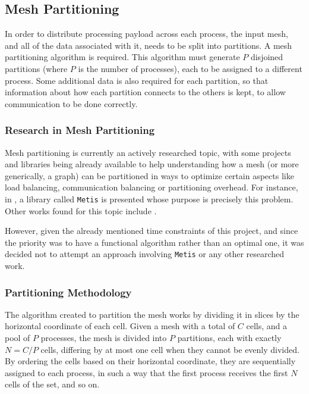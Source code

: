 \subsection{Mesh Partitioning}
\label{subsec:mpi:partitioning}


In order to distribute processing payload across each process, the input mesh, and all of the data associated with it, needs to be split into partitions.
A mesh partitioning algorithm is required. This algorithm must generate $P$ disjoined partitions (where $P$ is the number of processes), each to be assigned to a different process.
Some additional data is also required for each partition, so that information about how each partition connects to the others is kept, to allow communication to be done correctly.

\subsubsection{Research in Mesh Partitioning}
\label{subsubsec:mpi:partitioning:research}

Mesh partitioning is currently an actively researched topic, with some projects and libraries being already available to help understanding how a mesh (or more generically, a graph) can be partitioned in ways to optimize certain aspects like load balancing, communication balancing or partitioning overhead.
For instance, in \cite{metis}, a library called \texttt{Metis} is presented whose purpose is precisely this problem. Other works found for this topic include \cite{gilbert1995, walshaw2000}.

However, given the already mentioned time constraints of this project, and since the priority was to have a functional algorithm rather than an optimal one, it was decided not to attempt an approach involving \texttt{Metis} or any other researched work.

\subsubsection{Partitioning Methodology}
\label{subsubsec:mpi:partitioning:method}

The algorithm created to partition the mesh works by dividing it in slices by the horizontal coordinate of each cell.
Given a mesh with a total of $C$ cells, and a pool of $P$ processes, the mesh is divided into $P$ partitions, each with exactly $N=C/P$ cells, differing by at most one cell when they cannot be evenly divided.
By ordering the cells based on their horizontal coordinate, they are sequentially assigned to each process, in such a way that the first process receives the first $N$ cells of the set, and so on.

